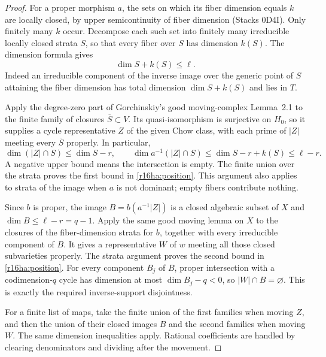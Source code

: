 \begin{proof}
For a proper morphism $a$, the sets on which its fiber dimension
equals $k$ are locally closed, by upper semicontinuity of fiber
dimension (Stacks 0D4I). Only finitely many $k$ occur. Decompose
each such set into finitely many irreducible locally closed strata
$S$, so that every fiber over $S$ has dimension $k(S)$.
The dimension formula gives
\[
                        \dim S+k(S)\leq\ell.
 \tag{HA16.2}\label{r16ha:dimension-bound}
\]
Indeed an irreducible component of the inverse image over the
generic point of $S$ attaining the fiber dimension has total
dimension $\dim S+k(S)$ and lies in $T$.

Apply the degree-zero part of Gorchinskiy's good moving-complex
Lemma~2.1 to the finite family of closures $\overline S\subset V$.
Its quasi-isomorphism is surjective on $H_0$, so it supplies a
cycle representative $Z$ of the given Chow class, with each
prime of $|Z|$ meeting every $\overline S$ properly. In particular,
\[
 \dim(|Z|\cap S)\leq\dim S-r,
 \qquad
 \dim a^{-1}(|Z|\cap S)
       \leq\dim S-r+k(S)\leq\ell-r.
\]
A negative upper bound means the intersection is empty.
The finite union over the strata proves the first bound in
\eqref{r16ha:position}. This argument also applies to strata of
the image when $a$ is not dominant; empty fibers contribute nothing.

Since $b$ is proper, the image
$B=b(a^{-1}|Z|)$ is a closed algebraic subset of $X$ and
$\dim B\leq\ell-r=q-1$. Apply the same good moving lemma on
$X$ to the closures of the fiber-dimension strata for $b$,
together with every irreducible component of $B$. It gives a
representative $W$ of $w$ meeting all those closed subvarieties
properly. The strata argument proves the second bound in
\eqref{r16ha:position}. For every component $B_j$ of $B$,
proper intersection with a codimension-$q$ cycle has dimension
at most $\dim B_j-q<0$, so $|W|\cap B=\varnothing$.
This is exactly the required inverse-support disjointness.

For a finite list of maps, take the finite union of the first
families when moving $Z$, and then the union of their closed
images $B$ and the second families when moving $W$. The same
dimension inequalities apply. Rational coefficients are handled
by clearing denominators and dividing after the movement.
\end{proof}

